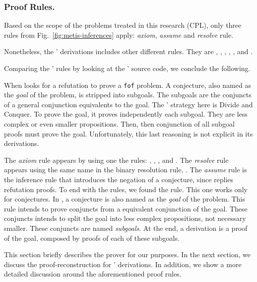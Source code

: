 \documentclass[../main.tex]{subfiles}
\begin{document}

\subsubsection{Proof Rules.}
\label{ssec:proof-rules}

Based on the scope of the problems treated in this research (CPL), only three rules from Fig.~\ref{fig:metis-inferences} apply: \emph{axiom}, \emph{assume} and \emph{resolve} rule.

Nonetheless, the \Metis' \TSTP derivations includes other different rules. They are \canonicalize, \clausify, \conjunct, \simplify, \negate, and
\strip.

Comparing the \Metis' rules by looking at the \Metis' source code, we conclude the following.

When \Metis looks for a refutation to prove a \verb!fof! problem.
A conjecture, also named as the \emph{goal} of the problem, is stripped into
subgoals. The subgoals are the conjuncts of a general conjunction equivalents to the goal. The \Metis' strategy here is Divide and Conquer. To prove the goal, it proves independently each subgoal. They are less complex or even smaller propositions. Then, then conjunction of all subgoal proofs must prove the goal. Unfortunately, this last reasoning is not explicit in its \TSTP derivations.

The \emph{axiom} rule appears by using one the rules: \canonicalize, \clausify, \conjunct, and \simplify. The \emph{resolve} rule appears using the
same name in the binary resolution rule, \resolve. The \emph{assume} rule is the inference rule \negate that introduces the negation of a conjecture, since \Metis replies refutation proofs. To end with the rules, we found the \strip rule. This one works only for conjectures. In \Metis, a conjecture is also named as the \emph{goal} of the problem. This rule intends to prove conjuncts from a equivalent conjunction of the goal. These conjuncts intends to split the goal into less complex propositions, not necessary smaller. These conjuncts are named \emph{subgoals}. At the end, a derivation is a proof of the goal, composed by proofs of each of these subgoals.

This section briefly describes the \Metis prover for our purposes.
In the next section, we discuss the proof-reconstruction for \Metis' \TSTP derivations. In addition, we show a more detailed discussion around
the aforementioned proof rules.
\end{document}
